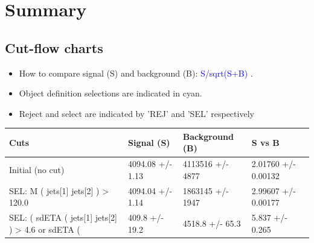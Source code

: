 \documentclass[a4paper, 10pt]{article}
\begin{document}
\newpage
\section{ Summary}

\subsection{Cut-flow charts}

\begin{itemize}
  \item How to compare signal (S) and background (B): \textcolor{blue}{S/\-sqrt(S+B)} .
   \item Object definition selections are indicated in cyan.  \item Reject and select are indicated by 'REJ' and 'SEL' respectively
\end{itemize}
\begin{table}[H]
  \begin{center}
    \begin{tabular}{|m{36.0mm}|m{36.0mm}|m{36.0mm}|m{33.0mm}|}
      \hline
      {\cellcolor{yellow}        Cuts}& {\cellcolor{yellow}         Signal (S)}& {\cellcolor{yellow}         Background (B)}& {\cellcolor{yellow}         S vs B}\\
      \hline
      {\cellcolor{white}         Initial (no cut)}& {\cellcolor{white}         4094.08 +/\-- 1.13}& {\cellcolor{white}         4113516 +/\-- 4877}& {\cellcolor{white}         2.01760 +/\-- 0.00132}\\
      \hline
      {\cellcolor{white} SEL: M ( jets[1] jets[2] ) > 120.0}& {\cellcolor{white}         4094.04 +/\-- 1.14}& {\cellcolor{white}         1863145 +/\-- 1947}& {\cellcolor{white}         2.99607 +/\-- 0.00177}\\
      \hline
      {\cellcolor{white} SEL: ( sdETA ( jets[1] jets[2] ) > 4.6 or sdETA ( }& {\cellcolor{white}         409.8 +/\-- 19.2}& {\cellcolor{white}         4518.8 +/\-- 65.3}& {\cellcolor{white}         5.837 +/\-- 0.265}\\
\hline
    \end{tabular}
  \end{center}
\end{table}
\end{document}

